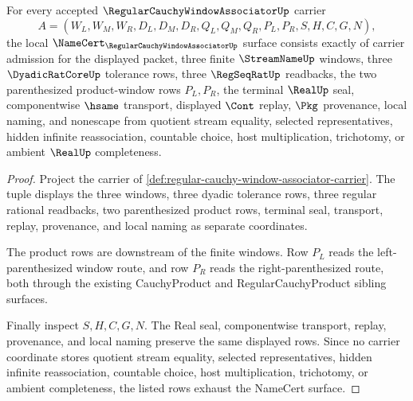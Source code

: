 \begin{theorem}
\label{thm:regular-cauchy-window-associator-namecert-obligations}
For every accepted $\RegularCauchyWindowAssociatorUp$ carrier
$$
A=(W_L,W_M,W_R,D_L,D_M,D_R,Q_L,Q_M,Q_R,P_L,P_R,S,H,C,G,N),
$$
the local $\NameCert_{\RegularCauchyWindowAssociatorUp}$ surface consists exactly of carrier admission for the displayed packet, three finite $\StreamNameUp$ windows, three $\DyadicRatCoreUp$ tolerance rows, three $\RegSeqRatUp$ readbacks, the two parenthesized product-window rows $P_L,P_R$, the terminal $\RealUp$ seal, componentwise $\hsame$ transport, displayed $\Cont$ replay, $\Pkg$ provenance, local naming, and nonescape from quotient stream equality, selected representatives, hidden infinite reassociation, countable choice, host multiplication, trichotomy, or ambient $\RealUp$ completeness.
\end{theorem}
\begin{proof}
Project the carrier of \autoref{def:regular-cauchy-window-associator-carrier}. The tuple displays the three windows, three dyadic tolerance rows, three regular rational readbacks, two parenthesized product rows, terminal seal, transport, replay, provenance, and local naming as separate coordinates.

The product rows are downstream of the finite windows. Row $P_L$ reads the left-parenthesized window route, and row $P_R$ reads the right-parenthesized route, both through the existing CauchyProduct and RegularCauchyProduct sibling surfaces.

Finally inspect $S,H,C,G,N$. The Real seal, componentwise transport, replay, provenance, and local naming preserve the same displayed rows. Since no carrier coordinate stores quotient stream equality, selected representatives, hidden infinite reassociation, countable choice, host multiplication, trichotomy, or ambient completeness, the listed rows exhaust the NameCert surface.
\end{proof}


